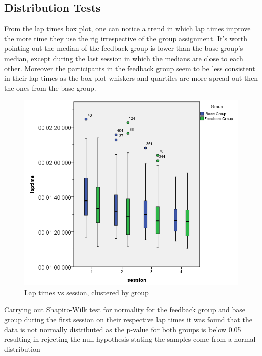 \subsection{Distribution Tests}
\label{sec:eval-distTests}

From the lap times box plot, one can notice a trend in which lap times improve the more time they use the rig irrespective of the group assignment. It's worth pointing out the median of the feedback group is lower than the base group's median, except during the last session in which the medians are close to each other. Moreover the participants in the feedback group seem to be less consistent in their lap times as the box plot whiskers and quartiles are more spread out then the ones from the base group.

\begin{figure}[!htb]
	\centering
	\includegraphics[width=\textwidth]{charts/laptimes.png}
	\caption{Lap times vs session, clustered by group}
	\label{fig:chart-laptimes}
\end{figure}

Carrying out Shapiro-Wilk test for normality for the feedback group and base group during the first session on their respective lap times it was found that the data is not normally distributed as the p-value for both groups is below 0.05 resulting in rejecting the null hypothesis stating the samples come from a normal distribution

